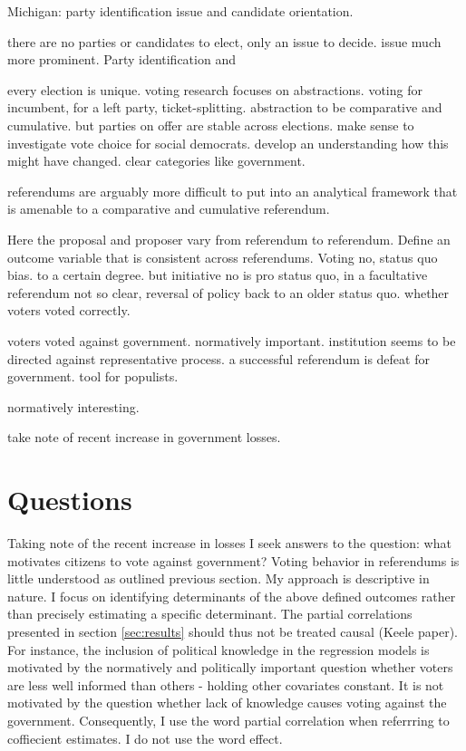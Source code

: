 \documentclass[11pt,a4paper]{article}
\begin{document}
Michigan: party identification issue and candidate orientation. 

there are no parties or candidates to elect, only an issue to decide. issue much more prominent. Party identification and 

every election is unique. voting research focuses on abstractions. voting for incumbent, for a left party, ticket-splitting. abstraction to be comparative and cumulative. but parties on offer are stable across elections. make sense to investigate vote choice for social democrats. develop an understanding how this might have changed. clear categories like government.

referendums are arguably more difficult to put into an analytical framework that is amenable to a comparative and cumulative referendum.

Here the proposal and proposer vary from referendum to referendum. 
Define an outcome variable that is consistent across referendums. Voting no, status quo bias. to a certain degree. but initiative no is pro status quo, in a facultative referendum not so clear, reversal of policy back to an older status quo. whether voters voted correctly. 

voters voted against government. normatively important. institution seems to be directed against representative process. a successful referendum is defeat for government. tool for populists.

normatively interesting.

take note of recent increase in government losses.

\section{Questions}

Taking note of the recent increase in losses I seek answers to the question: what motivates citizens to vote against government? Voting behavior in referendums is little understood as outlined previous section.
My approach is descriptive in nature. I focus on identifying determinants of the above defined outcomes rather than precisely estimating a specific determinant. The partial correlations presented in section \ref{sec:results} should thus not be treated causal (Keele paper). For instance, the inclusion of political knowledge in the regression models is motivated by the normatively and politically important question whether voters are less well informed than others - holding other covariates constant. It is not motivated by the question whether lack of knowledge causes voting against the government. Consequently, I use the word partial correlation when referrring to coffiecient estimates. I do not use the word effect. 
\end{document}
